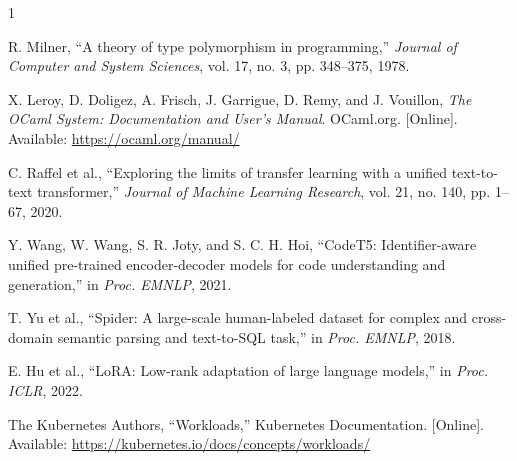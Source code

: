 \documentclass[conference]{IEEEtran}
\begin{document}
\begin{thebibliography}{1}

R. Milner, ``A theory of type polymorphism in programming,'' \emph{Journal of
Computer and System Sciences}, vol. 17, no. 3, pp. 348--375, 1978.

X. Leroy, D. Doligez, A. Frisch, J. Garrigue, D. Remy, and J. Vouillon,
\emph{The OCaml System: Documentation and User's Manual}. OCaml.org. [Online].
Available: \url{https://ocaml.org/manual/}

C. Raffel et al., ``Exploring the limits of transfer learning with a unified
text-to-text transformer,'' \emph{Journal of Machine Learning Research},
vol. 21, no. 140, pp. 1--67, 2020.

Y. Wang, W. Wang, S. R. Joty, and S. C. H. Hoi, ``CodeT5:
Identifier-aware unified pre-trained encoder-decoder models for code
understanding and generation,'' in \emph{Proc. EMNLP}, 2021.

T. Yu et al., ``Spider: A large-scale human-labeled dataset for complex and
cross-domain semantic parsing and text-to-SQL task,'' in \emph{Proc. EMNLP},
2018.

E. Hu et al., ``LoRA: Low-rank adaptation of large language models,'' in
\emph{Proc. ICLR}, 2022.

The Kubernetes Authors, ``Workloads,'' Kubernetes Documentation. [Online].
Available: \url{https://kubernetes.io/docs/concepts/workloads/}

\end{thebibliography}
\end{document}
